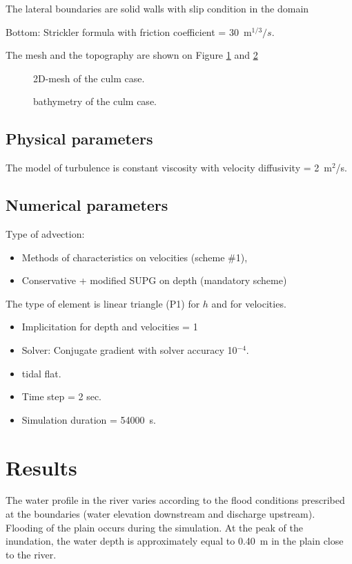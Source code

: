 The lateral boundaries are solid walls with slip condition in the domain

Bottom: Strickler formula with friction coefficient = 30~m$^{1/3}/s$.

The mesh and the topography are shown on Figure \ref{fig:culm:Mesh} and \ref{fig:culm:Bathy}
\begin{figure}[H]
 \centering
  \caption{2D-mesh of the culm case.}\label{fig:culm:Mesh}
\end{figure}


\begin{figure}[H]
 \centering
  \caption{bathymetry of the culm case.}\label{fig:culm:Bathy}
\end{figure}

\subsection{Physical parameters}

The model of turbulence is constant viscosity
with velocity diffusivity = 2~m$^2$/s.

\subsection{Numerical parameters}
Type of advection:
\begin{itemize}
\item Methods of characteristics on velocities (scheme \#1),
\item Conservative + modified SUPG on depth (mandatory scheme)
\end{itemize}
The type of element is linear triangle (P1) for $h$ and for velocities.

\begin{itemize}
\item Implicitation for depth and  velocities = 1
\item Solver: Conjugate gradient with solver accuracy 10$^{-4}$.
\item tidal flat.
\item Time step = 2 sec.
\item  Simulation duration = 54000~s.
\end{itemize}

\section{Results}
The water profile in the river varies according to the flood conditions prescribed at the boundaries
(water elevation downstream and discharge upstream). Flooding of the plain occurs during
the simulation. At the peak of the inundation, the water depth is approximately equal to 0.40~m
in the plain close to the river.

